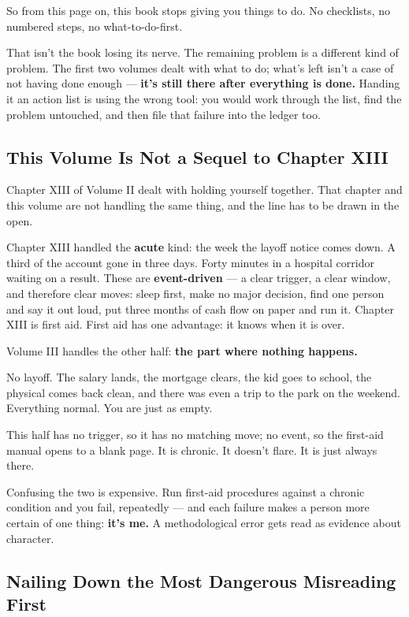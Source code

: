\documentclass[11pt,a4paper]{article}
\begin{document}
So from this page on, this book stops giving you things to do. No checklists, no numbered steps, no what-to-do-first.

That isn't the book losing its nerve. The remaining problem is a different kind of problem. The first two volumes dealt with what to do; what's left isn't a case of not having done enough --- \textbf{it's still there after everything is done.} Handing it an action list is using the wrong tool: you would work through the list, find the problem untouched, and then file that failure into the ledger too.

\subsection{This Volume Is Not a Sequel to Chapter XIII}

Chapter XIII of Volume II dealt with holding yourself together. That chapter and this volume are not handling the same thing, and the line has to be drawn in the open.

Chapter XIII handled the \textbf{acute} kind: the week the layoff notice comes down. A third of the account gone in three days. Forty minutes in a hospital corridor waiting on a result. These are \textbf{event-driven} --- a clear trigger, a clear window, and therefore clear moves: sleep first, make no major decision, find one person and say it out loud, put three months of cash flow on paper and run it. Chapter XIII is first aid. First aid has one advantage: it knows when it is over.

Volume III handles the other half: \textbf{the part where nothing happens.}

No layoff. The salary lands, the mortgage clears, the kid goes to school, the physical comes back clean, and there was even a trip to the park on the weekend. Everything normal. You are just as empty.

This half has no trigger, so it has no matching move; no event, so the first-aid manual opens to a blank page. It is chronic. It doesn't flare. It is just always there.

Confusing the two is expensive. Run first-aid procedures against a chronic condition and you fail, repeatedly --- and each failure makes a person more certain of one thing: \textbf{it's me.} A methodological error gets read as evidence about character.

\subsection{Nailing Down the Most Dangerous Misreading First}
\end{document}
